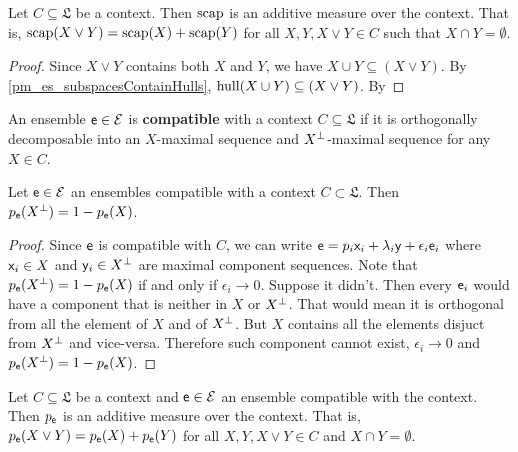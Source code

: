 \begin{prop}
	Let $C \subseteq \mathfrak{L}$ be a context. Then $\scap$ is an additive measure over the context. That is, $\scap(X \vee Y) = \scap(X) + \scap(Y)$ for all $X, Y, X \vee Y \in C$ such that $X \cap Y = \emptyset$.
\end{prop}

\begin{proof}
	Since $X \vee Y$ contains both $X$ and $Y$, we have $X \cup Y \subseteq(X \vee Y)$. By \ref{pm_es_subspacesContainHulls}, $\hull(X \cup Y) \subseteq(X \vee Y)$. By 
\end{proof}

\begin{defn}
	An ensemble $\ens \in \Ens$ is \textbf{compatible} with a context $C \subseteq \mathfrak{L}$ if it is orthogonally decomposable into an $X$-maximal sequence and $X^{\ortho}$-maximal sequence for any $X \in C$.
\end{defn}

\begin{coro}
	Let $\ens \in \Ens$ an ensembles compatible with a context $C \subset \mathfrak{L}$. Then $p_{\ens}(X^\ortho) = 1 - p_{\ens}(X)$.
\end{coro}

\begin{proof}
	Since $\ens$ is compatible with $C$, we can write $\ens = p_i \ens[x]_i + \lambda_i \ens[y] + \epsilon_i \ens_i$ where $\ens[x]_i \in X$ and $\ens[y]_i \in X^\ortho$ are maximal component sequences. Note that $p_{\ens}(X^\ortho) = 1 - p_{\ens}(X)$ if and only if $\epsilon_i \to 0$. Suppose it didn't. Then every $\ens_i$ would have a component that is neither in $X$ or $X^\ortho$. That would mean it is orthogonal from all the element of $X$ and of $X^\ortho$. But $X$ contains all the elements disjuct from $X^\ortho$ and vice-versa. Therefore such component cannot exist, $\epsilon_i \to 0$ and $p_{\ens}(X^\ortho) = 1 - p_{\ens}(X)$.
\end{proof}

\begin{conj}
	Let $C \subseteq \mathfrak{L}$ be a context and $\ens \in \Ens$ an ensemble compatible with the context. Then $p_{\ens}$ is an additive measure over the context. That is, $p_{\ens}(X \vee Y) = p_{\ens}(X) + p_{\ens}(Y)$ for all $X, Y, X \vee Y \in C$ and $X \cap Y = \emptyset$.
\end{conj}


